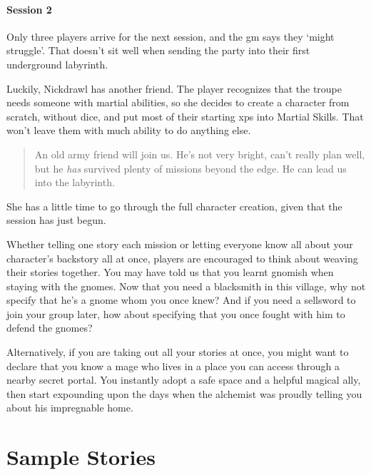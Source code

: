 \begin{multicols}{2}
\begin{exampletext}
\end{exampletext}

\begin{exampletext}
  \paragraph{Session 2}
  Only three players arrive for the next session, and the \gls{gm} says they `might struggle'.
  That doesn't sit well when sending the party into their first underground labyrinth.

  Luckily, Nickdrawl has another friend.
  The player recognizes that the troupe needs someone with martial abilities, so she decides to create a character from scratch, without dice, and put most of their starting \glspl{xp} into Martial Skills.
  That won't leave them with much ability to do anything else.

  \begin{quotation}
    An old army friend will join us.
    He's not very bright, can't really plan well, but he \emph{has} survived plenty of missions beyond the \gls{edge}.
    He can lead us into the labyrinth.
  \end{quotation}

  She has a little time to go through the full character creation, given that the session has just begun.
\end{exampletext}

Whether telling one story each mission or letting everyone know all about your character's backstory all at once, players are encouraged to think about weaving their stories together.
You may have told us that you learnt gnomish when staying with the gnomes.
Now that you need a blacksmith in this village, why not specify that he's a gnome whom you once knew?
And if you need a sellsword to join your group later, how about specifying that you once fought with him to defend the gnomes?

Alternatively, if you are taking out all your stories at once, you might want to declare that you know a mage who lives in a place you can access through a nearby secret portal.
You instantly adopt a safe space and a helpful magical ally, then start expounding upon the days when the alchemist was proudly telling you about his impregnable home.

\end{multicols}

\section{Sample Stories}

